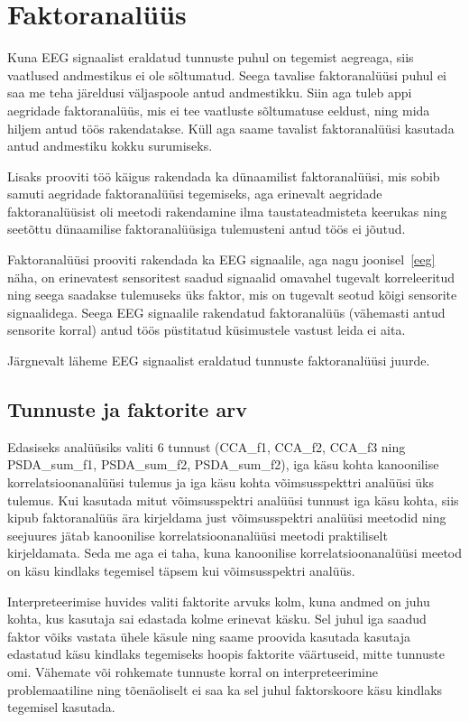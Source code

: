 \documentclass[a4paper,12pt]{report}
\begin{document}
\chapter{Faktoranalüüs}

Kuna EEG signaalist eraldatud tunnuste puhul on tegemist aegreaga, siis vaatlused andmestikus ei ole sõltumatud. Seega tavalise faktoranalüüsi puhul ei saa me teha järeldusi väljaspoole antud andmestikku. Siin aga tuleb appi aegridade faktoranalüüs, mis ei tee vaatluste sõltumatuse eeldust, ning mida hiljem antud töös rakendatakse. Küll aga saame tavalist faktoranalüüsi kasutada antud andmestiku kokku surumiseks.

Lisaks prooviti töö käigus rakendada ka dünaamilist faktoranalüüsi, mis sobib samuti aegridade faktoranalüüsi tegemiseks, aga erinevalt aegridade faktoranalüüsist oli meetodi rakendamine ilma taustateadmisteta keerukas ning seetõttu dünaamilise faktoranalüüsiga tulemusteni antud töös ei jõutud.

Faktoranalüüsi prooviti rakendada ka EEG signaalile, aga nagu joonisel~\ref{eeg} näha, on erinevatest sensoritest saadud signaalid omavahel tugevalt korreleeritud ning seega saadakse tulemuseks üks faktor, mis on tugevalt seotud kõigi sensorite signaalidega. Seega EEG signaalile rakendatud faktoranalüüs (vähemasti antud sensorite korral) antud töös püstitatud küsimustele vastust leida ei aita.

Järgnevalt läheme EEG signaalist eraldatud tunnuste faktoranalüüsi juurde.

\section{Tunnuste ja faktorite arv}\label{faktorid}

Edasiseks analüüsiks valiti 6 tunnust (CCA\_f1, CCA\_f2, CCA\_f3 ning PSDA\_sum\_f1, PSDA\_sum\_f2, PSDA\_sum\_f2), iga käsu kohta kanoonilise korrelatsioonanalüüsi tulemus ja iga käsu kohta võimsusspekttri analüüsi üks tulemus. Kui kasutada mitut võimsusspektri analüüsi tunnust iga käsu kohta, siis kipub faktoranalüüs ära kirjeldama just võimsusspektri analüüsi meetodid ning seejuures jätab kanoonilise korrelatsioonanalüüsi meetodi praktiliselt kirjeldamata. Seda me aga ei taha, kuna kanoonilise korrelatsioonanalüüsi meetod on käsu kindlaks tegemisel täpsem kui võimsusspektri analüüs.

Interpreteerimise huvides valiti faktorite arvuks kolm, kuna andmed on juhu kohta, kus kasutaja sai edastada kolme erinevat käsku. Sel juhul iga saadud faktor võiks vastata ühele käsule ning saame proovida kasutada kasutaja edastatud käsu kindlaks tegemiseks hoopis faktorite väärtuseid, mitte tunnuste omi. Vähemate või rohkemate tunnuste korral on interpreteerimine problemaatiline ning tõenäoliselt ei saa ka sel juhul faktorskoore käsu kindlaks tegemisel kasutada.
\end{document}
